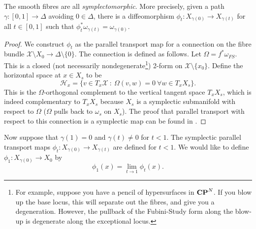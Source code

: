 \documentclass{article}
\begin{document}
\begin{Lemma}\label{lma:spt}
The smooth fibres are all {\em symplectomorphic}. More precisely,
given a path \(\gamma\colon[0,1]\to\Delta\) avoiding \(0\in\Delta\),
there is a diffeomorphism \(\phi_t\colon X_{\gamma(0)}\to
X_{\gamma(t)}\) for all \(t\in[0,1]\) such that
\(\phi_t^*\omega_{\gamma(t)}=\omega_{\gamma(0)}\).
\end{Lemma}
\begin{proof}
We construct \(\phi_t\) as the parallel transport map for a
connection on the fibre bundle \(\mathcal{X}\setminus
X_0\to\Delta\setminus\{0\}\). The connection is defined as
follows. Let \(\Omega=f^*\omega_{FS}\). This is a closed (not
necessarily nondegenerate\footnote{For example, suppose you have a
pencil of hypersurfaces in \(\mathbf{CP}^{N}\). If you blow up the base
locus, this will separate out the fibres, and give you a
degeneration. However, the pullback of the Fubini-Study form along
the blow-up is degenerate along the exceptional locus.}) 2-form on
\(\mathcal{X}\setminus\{x_0\}\). Define the horizontal space at
\(x\in X_s\) to be \[\mathcal{H}_x=\{v\in T_x\mathcal{X}\ :\
\Omega(v,w)=0\ \forall w\in T_xX_s\}.\] This is the
\(\Omega\)-orthogonal complement to the vertical tangent space
\(T_xX_s\), which is indeed complementary to \(T_xX_s\) because
\(X_s\) is a symplectic submanifold with respect to \(\Omega\)
(\(\Omega\) pulls back to \(\omega_s\) on \(X_s\)). The proof that
parallel transport with respect to this connection is a symplectic
map can be found in {\cite[Lemma 6.18]{McDuffSalamon}}. \qedhere


\end{proof}
Now suppose that \(\gamma(1)=0\) and \(\gamma(t)\neq 0\) for
\(t<1\). The symplectic parallel transport maps \(\phi_t\colon
X_{\gamma(0)}\to X_{\gamma(t)}\) are defined for \(t<1\). We would
like to define \(\phi_1\colon X_{\gamma(0)}\to X_0\) by
\[\phi_1(x)=\lim_{t\to 1}\phi_t(x).\]
\end{document}
